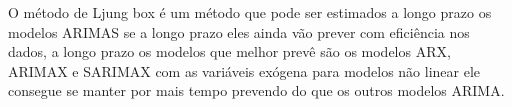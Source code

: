 O método de Ljung box é um método que pode ser estimados a longo prazo os modelos ARIMAS se a longo prazo eles ainda vão prever com eficiência nos dados, a longo prazo os modelos que melhor prevê são os modelos ARX, ARIMAX e SARIMAX com as variáveis exógena para modelos não linear ele consegue se manter por mais tempo prevendo do que os outros modelos ARIMA.  
 
  
    

    
